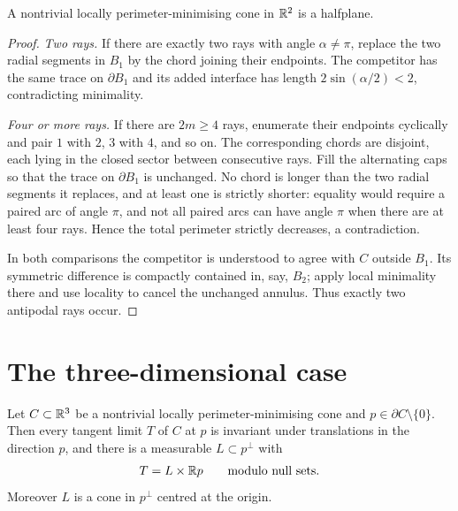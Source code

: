 \begin{lemma}\label{lem:cone-2d}
A nontrivial locally perimeter-minimising cone in $\mathbb R^2$ is a halfplane.
\end{lemma}

\begin{proof}
\emph{Two rays.}  If there are exactly two rays with angle
$\alpha\ne\pi$, replace the two radial segments in $B_1$ by the chord joining
their endpoints.  The competitor has the same trace on $\partial B_1$ and its
added interface has length $2\sin(\alpha/2)<2$, contradicting minimality.

\emph{Four or more rays.}  If there are $2m\ge4$ rays, enumerate their
endpoints cyclically and pair $1$ with $2$, $3$ with $4$, and so on.  The
corresponding chords are disjoint, each lying in the closed sector between
consecutive rays.  Fill the alternating caps so that the trace on
$\partial B_1$ is unchanged.  No chord is longer than the two radial segments
it replaces, and at least one is strictly shorter: equality would require a
paired arc of angle $\pi$, and not all paired arcs can have angle $\pi$ when
there are at least four rays.  Hence the total perimeter strictly decreases, a
contradiction.

In both comparisons the competitor is understood to agree with $C$ outside
$B_1$.  Its symmetric difference is compactly contained in, say, $B_2$;
apply local minimality there and use locality to cancel the unchanged annulus.
Thus exactly two antipodal rays occur.
\end{proof}

\section{The three-dimensional case}

\begin{lemma}\label{lem:cone-tangent-cylinder}
Let $C\subset\mathbb R^3$ be a nontrivial locally perimeter-minimising cone and
$p\in\partial C\setminus\{0\}$.  Then every tangent limit $T$ of $C$ at $p$ is
invariant under translations in the direction $p$, and there is a measurable
$L\subset p^\perp$ with
\begin{equation}\label{eq:cone-product}
  T=L\times\mathbb R p\qquad\text{modulo null sets.}
\end{equation}
Moreover $L$ is a cone in $p^\perp$ centred at the origin.
\end{lemma}

